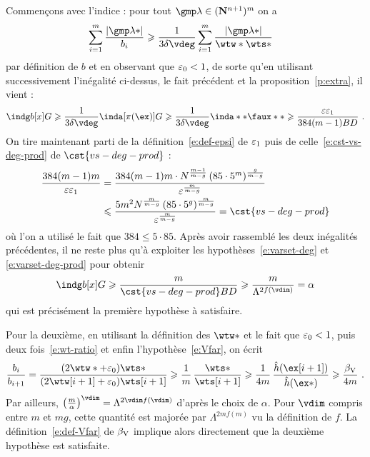 Commençons avec l'indice : pour tout \( \imp \in (\N^{n+1})^m \) on a
\begin{align}
  \sum\fctrange \frac{ \lgr{\imp*} }{ b_\fct }
  & \ge
  \frac1{ 3 \delta \vdeg }
  \sum\fctrange
  \frac{ \lgr{\imp*} }{ \wtw* \wts* }
\end{align}
par définition de \( b \) et en observant que \( \varepsilon\sb0 < 1 \), de sorte qu'en
utilisant successivement l'inégalité ci-dessus, le fait précédent et la
proposition~\vref{p:extra}, il vient :
\begin{equation}
  \indg b[x] G
  \ge
  \frac1{ 3 \delta \vdeg } \inda[\pi(\ex)] G
  \ge
  \frac1{ 3 \delta \vdeg } \inda** \faux**
  \ge
  \frac{ \eps \epsi }{ 384 (m-1) B D }
  \pmm.
\end{equation}
On tire maintenant parti de la définition~\eqref{e:def-epsi} de \( \varepsilon\sb1
\) puis de celle~\eqref{e:cst-vs-deg-prod} de \( \cst{vs-deg-prod} \) :
\begin{align}
  \frac{ 384 (m-1) m }{ \eps \epsi }
  & =
  \frac{
    384 (m-1) m
    \cdot N^{ \frac{m-1}{m-g} }
    \, (85 \cdot 5^m)^{ \frac{g}{m-g} }
  }{
    \eps^{ \frac{m}{m-g} }
  }
  \\ & \le
  \frac{
    5 m^2
    N^{ \frac{m}{m-g} }
    \, (85 \cdot 5^g)^{ \frac{m}{m-g} }
  }{
    \eps^{ \frac{m}{m-g} }
  }
  =
  \cst{vs-deg-prod}
  \label{e:ct-cst-vs-deg}
\end{align}
où l'on a utilisé le fait que \( 384 \le 5 \cdot 85 \).
Après avoir rassemblé les deux inégalités précédentes, il ne reste plus qu'à
exploiter les hypothèses~\eqref{e:varset-deg} et \eqref{e:varset-deg-prod}
pour obtenir
\begin{equation} \label{e:tp-ind}
  \indg b[x] G
  \ge
  \frac{ m }{ \cst{vs-deg-prod} B D }
  \ge
  \frac{ m }{ \Lambda^{2f(\vdim)} }
  =
  \alpha
\end{equation}
qui est précisément la première hypothèse à satisfaire.

Pour la deuxième, en utilisant la définition des \( \wtw* \) et le fait que \(
  \varepsilon\sb0 < 1 \), puis deux fois~\eqref{e:wt-ratio} et enfin
l'hypothèse~\eqref{e:Vfar}, on écrit
\begin{equation} \label{e:ct-Vfar}
  \frac{ b_\fct }{ b_{\fct+1} }
  =
  \frac{
    (2\wtw* + \epsz) \wts*
  }{
    (2\wtw[\fct+1] + \epsz) \wts[\fct+1]
  }
  \ge
  \frac1m \,
  \frac{ \wts* }{ \wts[\fct+1] }
  \ge
  \frac1{4m} \,
  \frac{ \hautn{ \ex[\fct+1] } }{ \hautn{ \ex* } }
  \ge
  \frac{ \Vfar }{ 4m }
  \pmm.
\end{equation}
Par ailleurs, \( \bigl( \frac m\alpha \bigr)^\vdim = \Lambda^{2\vdim
    f(\vdim)} \) d'après le choix de \( \alpha \). Pour \( \vdim \) compris
entre \( m \) et \( mg \), cette quantité est majorée par \(
  \Lambda^{2m f(m)} \) vu la définition de \( f \). La
définition~\eqref{e:def-Vfar} de \( \beta \sb{\mathrm{V}} \) implique alors directement que la
deuxième hypothèse est satisfaite.

